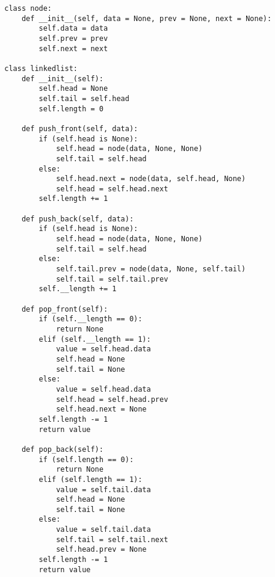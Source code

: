     \begin{lstlisting}
        class node:
            def __init__(self, data = None, prev = None, next = None):
                self.data = data
                self.prev = prev
                self.next = next

        class linkedlist:
            def __init__(self):
                self.head = None
                self.tail = self.head
                self.length = 0
                
            def push_front(self, data):
                if (self.head is None):
                    self.head = node(data, None, None)
                    self.tail = self.head
                else:
                    self.head.next = node(data, self.head, None)
                    self.head = self.head.next
                self.length += 1
                
            def push_back(self, data):
                if (self.head is None):
                    self.head = node(data, None, None)
                    self.tail = self.head
                else:
                    self.tail.prev = node(data, None, self.tail)
                    self.tail = self.tail.prev
                self.__length += 1
                
            def pop_front(self):
                if (self.__length == 0):
                    return None
                elif (self.__length == 1):
                    value = self.head.data
                    self.head = None
                    self.tail = None
                else:
                    value = self.head.data
                    self.head = self.head.prev
                    self.head.next = None
                self.length -= 1
                return value
                    
            def pop_back(self):
                if (self.length == 0):
                    return None
                elif (self.length == 1):
                    value = self.tail.data
                    self.head = None
                    self.tail = None
                else:
                    value = self.tail.data
                    self.tail = self.tail.next
                    self.head.prev = None
                self.length -= 1
                return value
    \end{lstlisting}




